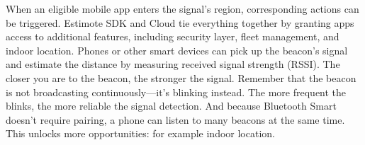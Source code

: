 \documentclass[12pt]{report}
\begin{document}
When an eligible mobile app enters the signal's region, corresponding actions can be triggered. Estimote SDK and Cloud tie everything together by granting apps access to additional features, including security layer, fleet management, and indoor location. Phones or other smart devices can pick up the beacon’s signal and estimate the distance by measuring received signal strength (RSSI). The closer you are to the beacon, the stronger the signal. Remember that the beacon is not broadcasting continuously—it’s blinking instead. The more frequent the blinks, the more reliable the signal detection. And because Bluetooth Smart doesn’t require pairing, a phone can listen to many beacons at the same time. This unlocks more opportunities: for example indoor location.

\begin{figure}[!t]
	\centering
\end{figure}
\end{document}
